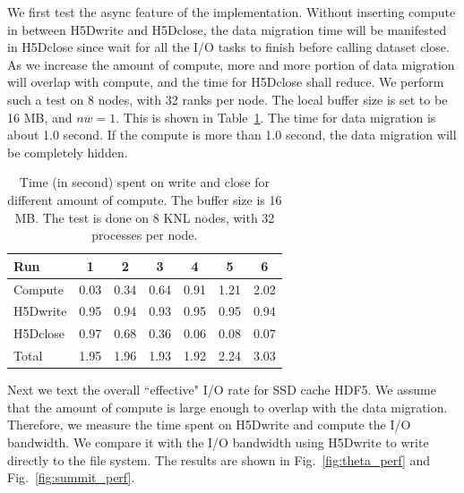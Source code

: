 \documentclass[aps, rmp, 11pt, notitlepage]{revtex4-1}
\begin{document}
We first test the async feature of the implementation. Without inserting compute in between H5Dwrite and H5Dclose, the data migration time will be manifested in H5Dclose since wait for all the I/O tasks to finish before calling dataset close. As we increase the amount of compute, more and more portion of data migration will overlap with compute, and the time for H5Dclose shall reduce. We perform such a test on 8 nodes, with 32 ranks per node. The local buffer size is set to be 16 MB, and $nw=1$. This is shown in Table~\ref{tab:async}. The time for data migration is about 1.0 second. If the compute is more than 1.0 second, the data migration will be completely hidden. 
\begin{table}[hbt]
\centering
\caption{Time (in second) spent on write and close for different amount of compute. The buffer size is 16 MB. The test is done on 8 KNL nodes, with 32 processes per node. }\label{tab:async}
\begin{tabular}{|l||cccccc|}
\hline
Run & 1 & 2 & 3 & 4 & 5 & 6  \\
\hline
\hline
Compute     & 0.03 &  0.34 & 0.64 & 0.91 & 1.21  & 2.02\\
H5Dwrite &  0.95 & 0.94 & 0.93 &  0.95 & 0.95  & 0.94 \\
H5Dclose & 0.97  & 0.68 & 0.36 & 0.06 & 0.08 & 0.07\\ 
\hline
\hline
Total & 1.95  & 1.96 & 1.93 & 1.92 & 2.24 & 3.03 \\
\hline
\end{tabular}
\end{table}

Next we text the overall ``effective" I/O rate for SSD cache HDF5. We assume that the amount of compute is large enough to overlap with the data migration. Therefore, we measure the time spent on H5Dwrite and compute the I/O bandwidth. We compare it with the I/O bandwidth using H5Dwrite to write directly to the file system. The results are shown in Fig.~\ref{fig:theta_perf} and Fig.~\ref{fig:summit_perf}. 
\end{document}
